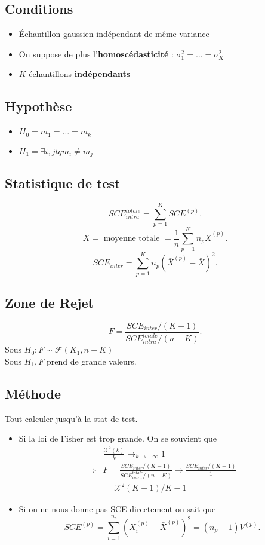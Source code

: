 \documentclass{article}
\theoremstyle{plain}%
\theoremstyle{definition}
\theoremstyle{remark}
\begin{document}
\subsection*{Conditions}
\begin{itemize}
    \item Échantillon gaussien indépendant de même variance
    \item On suppose de plus l'\textbf{homoscédasticité} : $ \sigma _1^2 = \dots = \sigma _K^2 $ 
    \item $ K $ échantillons \textbf{indépendants}
\end{itemize}

\subsection*{Hypothèse}
\begin{itemize}
    \item $ H_0 = m_1 = \dots = m_k $ 
    \item $ H_1 = \exists i,j tq m_i \neq m_j $ 
\end{itemize}

\subsection*{Statistique de test}
\[
    SCE^{totale}_{intra} = \sum_{p=1}^{K}SCE^{(p)}
.\]
\[
    \bar{X} = \text{ moyenne totale } = \frac{1}{n}\sum_{p=1}^{K} n_p \bar{X}^{(p)}
.\]
\[
    SCE_{inter} = \sum_{p=1}^{K} n_p (\bar{X}^{(p)} - \bar{X})^2
.\]
\subsection*{Zone de Rejet}
\[
    F = \frac{SCE_{inter} / (K-1)}{SCE_{intra}^{totale} / (n-K)}
.\]
Sous $ H_0 : F \sim \mathcal{F}(K_1, n-K) $ \\
Sous $ H_1, F $ prend de grande valeurs.

\subsection*{Méthode}
Tout calculer jusqu'à la stat de test. \begin{itemize}
    \item Si la loi de Fisher est trop grande. On se souvient que \begin{align*}
        &\frac{\mathcal{X}^2(k)}{k} \to _{k \to +\infty} 1 \\
        \Rightarrow & F = \frac{SCE_{inter} / (K-1)}{SCE_{intra}^{totale} / (n-K)} \to \frac{SCE_{inter} / (K-1)}{1} \\
        &= \mathcal{X}^2(K-1) / K-1
    \end{align*}
    \item Si on ne nous donne pas SCE directement on sait que
    \[
        SCE^{(p)} = \sum_{i=1}^{n_p} (X_i^{(p)} - \bar{X}^{(p)})^2 = (n_p -1) V^{(p)}
    .\]
\end{itemize}
\end{document}
